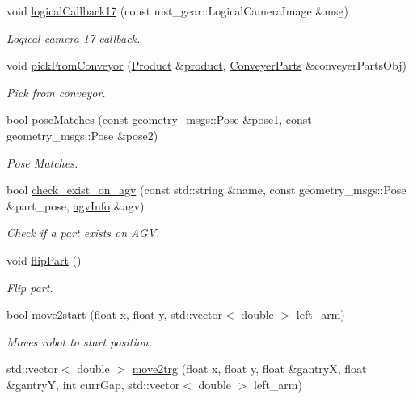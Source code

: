 \begin{DoxyCompactItemize}
void \hyperlink{classGantryControl_a9d745504ec1dbcc8549f5a604f34bbcc}{logical\+Callback17} (const nist\+\_\+gear\+::\+Logical\+Camera\+Image \&msg)
\begin{DoxyCompactList}\small\item\em Logical camera 17 callback. \end{DoxyCompactList}\item 
void \hyperlink{classGantryControl_aa12af59b0fda9a1437db989a13036934}{pick\+From\+Conveyor} (\hyperlink{structProduct}{Product} \&\hyperlink{utils_8h_a48a7207852c0455cce7e65703b12ec7e}{product}, \hyperlink{classConveyerParts}{Conveyer\+Parts} \&conveyer\+Parts\+Obj)
\begin{DoxyCompactList}\small\item\em Pick from conveyor. \end{DoxyCompactList}\item 
bool \hyperlink{classGantryControl_a9c655daed586e64921ffc53cb90b2873}{pose\+Matches} (const geometry\+\_\+msgs\+::\+Pose \&pose1, const geometry\+\_\+msgs\+::\+Pose \&pose2)
\begin{DoxyCompactList}\small\item\em Pose Matches. \end{DoxyCompactList}\item 
bool \hyperlink{classGantryControl_a31672ce076ba59662af6c77c82ab136f}{check\+\_\+exist\+\_\+on\+\_\+agv} (const std\+::string \&name, const geometry\+\_\+msgs\+::\+Pose \&part\+\_\+pose, \hyperlink{structagvInfo}{agv\+Info} \&agv)
\begin{DoxyCompactList}\small\item\em Check if a part exists on A\+GV. \end{DoxyCompactList}\item 
void \hyperlink{classGantryControl_a80a0b29105892d6435ef1bb061f35d8f}{flip\+Part} ()
\begin{DoxyCompactList}\small\item\em Flip part. \end{DoxyCompactList}\item 
bool \hyperlink{classGantryControl_adfbb542c0c4b836ec50bc7cf70557220}{move2start} (float x, float y, std\+::vector$<$ double $>$ left\+\_\+arm)
\begin{DoxyCompactList}\small\item\em Moves robot to start position. \end{DoxyCompactList}\item 
std\+::vector$<$ double $>$ \hyperlink{classGantryControl_aa3b48219dcba01f5608c6a4d9ff447e9}{move2trg} (float x, float y, float \&gantryX, float \&gantryY, int curr\+Gap, std\+::vector$<$ double $>$ left\+\_\+arm)

\end{DoxyCompactItemize}
